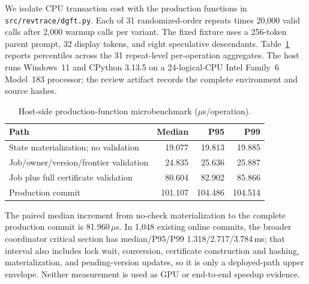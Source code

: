 We isolate CPU transaction cost with the production functions in
\texttt{src/revtrace/dgft.py}. Each of 31 randomized-order repeats times
20{,}000 valid calls after 2{,}000 warmup calls per variant. The fixed fixture
uses a 256-token parent prompt, 32 display tokens, and eight speculative
descendants. Table~\ref{supp:tab:overhead} reports percentiles across the 31
repeat-level per-operation aggregates. The host runs Windows~11 and CPython
3.13.5 on a 24-logical-CPU Intel Family~6 Model~183 processor; the review
artifact records the complete environment and source hashes.

\begin{table}[t]
\caption{Host-side production-function microbenchmark ($\mu$s/operation).}
\label{supp:tab:overhead}
\centering
\footnotesize
\begin{tabular}{@{}lrrr@{}}
\toprule
Path & Median & P95 & P99 \\
\midrule
State materialization; no validation & 19.077 & 19.813 & 19.885 \\
Job/owner/version/frontier validation & 24.835 & 25.636 & 25.887 \\
Job plus full certificate validation & 80.604 & 82.902 & 85.866 \\
Production commit & 101.107 & 104.486 & 104.514 \\
\bottomrule
\end{tabular}
\end{table}

The paired median increment from no-check materialization to the complete
production commit is 81.960\,$\mu$s. In 1{,}048 existing online commits, the
broader coordinator critical section has median/P95/P99
1.318/2.717/3.784\,ms; that interval also includes lock wait, conversion,
certificate construction and hashing, materialization, and pending-version
updates, so it is only a deployed-path upper envelope. Neither measurement is
used as GPU or end-to-end speedup evidence.

